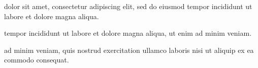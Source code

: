 \newpage
{}

\begin{description}[font=\normalfont\bfseries, labelindent=0pt, leftmargin=0pt, itemsep=0pt, topsep=0pt, parsep=0pt]
    \item[Lorem ipsum:] dolor sit amet, consectetur adipiscing elit, sed do eiusmod tempor incididunt ut labore et dolore magna aliqua.
    \item[Sed do eiusmod:] tempor incididunt ut labore et dolore magna aliqua, ut enim ad minim veniam.
    \item[Ut enim:] ad minim veniam, quis nostrud exercitation ullamco laboris nisi ut aliquip ex ea commodo consequat.
\end{description}

